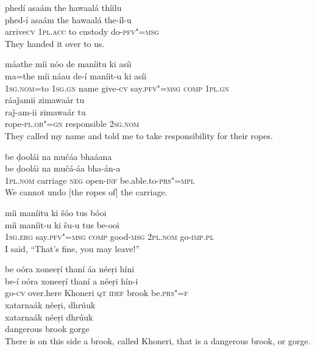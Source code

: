 \begin{exe}
\ex
\label{ex:7}
\glll phedí	asaám	the	hawaalá	thíilu \\
phed-í	asaám	the	hawaalá	the-íl-u \\
arrive\textsc{cv}	\textsc{1pl.acc}	to	custody	do-\textsc{pfv"=msg} \\
\glt They handed it over to us.

\ex
\label{ex:8}
\glll máathe	míi	nóo	de	maníitu	ki	asíi \\
ma=the	míi	náau	de-í	maníit-u	ki	asíi \\
\textsc{1sg.nom}=to \textsc{1sg.gn}	name	give-\textsc{cv}	say.\textsc{pfv"=msg}	   \textsc{comp} \textsc{1pl.gn} \\
\glll ráaǰamii	zimawaár	tu \\
raǰ-am-ii	zimawaár	tu \\
rope-\textsc{pl.ob"=gn}	responsible	\textsc{2sg.nom} \\
\glt They called my name and told me to take responsibility for their ropes.

\ex
\label{ex:9} 
\glll be	ḍoolái	na	mučáa	bhaáana \\
be	ḍoolái	na	mučá-áa	bha-án-a \\
\textsc{1pl.nom}	carriage \textsc{neg}	open-\textsc{inf}	be.able.to-\textsc{prs"=mpl} \\
\glt We cannot undo [the ropes of] the carriage.

\ex
\label{ex:10}
\glll míi	maníitu	ki	šóo	tus	bóoi \\
míi	maníit-u	ki	šu-u	tus	be-ooi \\
\textsc{1sg.erg}	say.\textsc{pfv"=msg} \textsc{comp}	good-\textsc{msg} \textsc{2pl.nom}	go-\textsc{imp.pl} \\
\glt I said, “That’s fine, you may leave!”

\ex
\label{ex:11}
\glll be	oóra	xoneeṛí	thaní	áa	néeṛi	híni \\
be-í	oóra	xoneeṛí	thaní	a	néeṛi	hín-i \\
go-\textsc{cv}	over.here	Khoneri	\textsc{qt}	\textsc{idef}	brook	be.\textsc{prs"=f} \\
\glll xatarnaák	néeṛi,	dhrúuk \\
xatarnaák	néeṛi	dhrúuk \\
dangerous	brook	gorge \\
\glt There is on this side a brook, called Khoneri, that is a dangerous brook, or gorge.



\end{exe}
